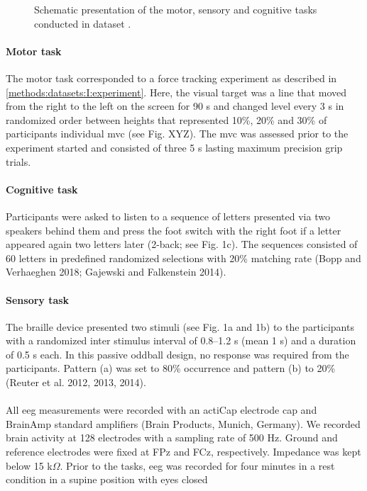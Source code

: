 \begin{figure}[h]
\begin{center}

\caption[Schematic presentation of the motor, sensory and cognitive tasks conducted in dataset .]{Schematic presentation of the motor, sensory and cognitive tasks conducted in dataset .}
\label{fig:DSII_exp3}
\end{center}
\end{figure}

\paragraph{Motor task}
The motor task corresponded to a force tracking experiment as described in \autoref{methods:datasets:I:experiment}. Here, the visual target was a line that moved from the right to the left on the screen for 90 s and changed level every 3 s in randomized order between heights that represented 10\%, 20\% and 30\% of participants individual \gls{mvc} (see Fig. XYZ). The \gls{mvc} was assessed prior to the experiment started and consisted of three 5 s lasting maximum precision grip trials.

\paragraph{Cognitive task}
Participants were asked to listen to a sequence of letters presented via two speakers behind them and press the foot
switch with the right foot if a letter appeared again two letters later (2-back; see Fig. 1c). The sequences consisted of 60 letters in predefined randomized selections with 20\% matching rate (Bopp and Verhaeghen 2018; Gajewski and Falkenstein 2014).

\paragraph{Sensory task}
The braille device presented two stimuli (see Fig. 1a and 1b) to the participants with a randomized inter stimulus
interval of 0.8–1.2 s (mean 1 s) and a duration of 0.5 s each. In this passive oddball design, no response was
required from the participants. Pattern (a) was set to 80\% occurrence and pattern (b) to 20\% (Reuter et al. 2012, 2013, 2014).\\
\\
All \gls{eeg} measurements were recorded with an actiCap electrode cap and BrainAmp standard amplifiers (Brain Products, Munich, Germany). We recorded brain activity at 128 electrodes with a sampling rate of 500 Hz. Ground and reference electrodes were fixed at FPz and FCz, respectively. Impedance was kept below 15 k$\Omega$. Prior to the tasks, \gls{eeg} was recorded for four minutes in a rest condition in a supine position with eyes closed

